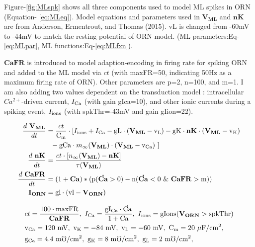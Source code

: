 \documentclass[
]{article}
\begin{document}
Figure-\ref{fig:MLspk} shows all three components used to model ML spikes in ORN (Equation- \eqref{eq:MLeq}). Model equations and parameters used in \(\mathbf{V_{ML}}\) and \(\mathbf{nK}\) are from Anderson, Ermentrout, and Thomas (2015). vL is changed from -60mV to -44mV to match the resting potential of ORN model. (ML parameters:Eq-\eqref{eq:MLpar}, ML functions:Eq-\eqref{eq:MLfxn}).

\(\mathbf{CaFR}\) is introduced to model adaption-encoding in firing rate for spiking ORN and added to the ML model via \(ct\) (with maxFR=50, indicating 50Hz as a maximum firing rate of ORN). Other parameters are p=2, n=100, and m=1. I am also adding two values dependent on the transduction model : intracellular \(Ca^{2+}\)-driven current, \(I_{\rm Ca}\) (with gain gIca=10), and other ionic currents during a spiking event, \(I_{\rm ions}\) (with spkThr=-43mV and gain gIion=22).

\begin{equation} \label{eq:MLeq}
\begin{split}
\frac{d\ \mathbf{V_{ML}}}{dt} &= \frac{ct}{\rm C_m} \cdot [ I_{\rm ions} + I_{\rm Ca} - {\rm gL} \cdot (\mathbf{V_{ML}} - {\rm v_L}) - {\rm gK} \cdot \mathbf{nK} \cdot (\mathbf{V_{ML}}-{\rm v_K}) \\
&\ \  - {\rm gCa} \cdot m_\infty(\mathbf{V_{ML}}) \cdot (\mathbf{V_{ML}}- {\rm v_{Ca}}) \ ] \\
\frac{d\ \mathbf{nK}}{dt} &= \frac{ct \cdot [ n_\infty(\mathbf{V_{ML}}) - \mathbf{nK} ]}{\tau(\mathbf{V_{ML}})} \\
\frac{d\ \mathbf{CaFR}}{dt} &= (1+\mathbf{Ca})*({\rm p}(\mathbf{\dot{Ca}} > 0) - {\rm n}(\mathbf{\dot{Ca}}<0\  \& \ \mathbf{CaFR} > {\rm m})) \\
 \mathbf{I_{ORN}} &= {\rm gl} \cdot ({\rm vl} - \mathbf{V_{ORN}})
\end{split}
\end{equation}

\begin{equation} \label{eq:MLpar}
\begin{split}
& ct = \frac{100\cdot {\rm maxFR}}{\mathbf{CaFR}},\ I_{\rm Ca} = {\rm \frac{gI_{Ca} \cdot \dot{Ca}}{1 + Ca}},\ I_{\rm ions}={\rm gIons (\mathbf{V_{ORN}} > spkThr )} \\
& {\rm v_{Ca}=120\ mV,\ v_K=-84\ mV,\ v_L=-60\ mV,\ C_m=20\ \mu F/cm^2,} \\ 
& {\rm g_{Ca}=4.4\ m\mho/cm^2,\ g_K=8\ m\mho/cm^2,\ g_L=2\ m\mho/cm^2,}
\end{split}
\end{equation}
\end{document}
